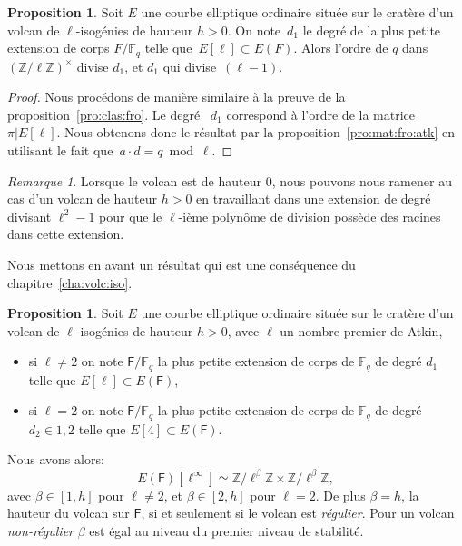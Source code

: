 \documentclass[10pt,a4paper]{book}
\theoremstyle{plain}
\theoremstyle{definition}
\theoremstyle{definition}
\theoremstyle{definition}
\theoremstyle{definition}
\newtheorem{prop}[thm]{Proposition}
\theoremstyle{definition}
\theoremstyle{remark}
\newtheorem{rem}[thm]{Remarque}
\theoremstyle{remark}
\theoremstyle{definition}
\begin{document}

\begin{prop}
Soit $E$ une courbe elliptique ordinaire située sur le cratère d'un 
volcan de $\ell$-isogénies de hauteur $h>0$. On note~$d_1$ le degré de la plus 
petite extension de corps $F/\mathbb{F}_q$ telle que~$E[\ell]\subset E(F)$. 
Alors l'ordre de $q$ dans $(\mathbb{Z}/ \ell \mathbb{Z})^\times$ divise $d_1$,
et $d_1$ qui divise~$(\ell-1)$.
\end{prop}

\begin{proof}
Nous procédons de manière similaire à la preuve de la proposition~\ref{pro:clas:fro}.
Le degré ~$d_1$ correspond à l'ordre de la matrice~$\pi|E[\ell]$.
Nous obtenons donc le résultat par la proposition~\ref{pro:mat:fro:atk} en 
utilisant le fait que~$a \cdot d = q \bmod \ell$. 
\end{proof}

\begin{rem}
\label{rem:hau:atk}
Lorsque le volcan est de hauteur $0$, nous pouvons nous ramener au cas d'un 
volcan de hauteur $h>0$ en travaillant dans une extension de degré divisant 
$\ell^2-1$ pour que le $\ell$-ième polynôme de division possède des racines 
dans cette extension.
\end{rem}

Nous mettons en avant un résultat qui est une conséquence du 
chapitre~\ref{cha:volc:iso}. 

\begin{prop}
\label{pro:atk:d1}
Soit $E$ une courbe elliptique ordinaire située sur le cratère d'un 
volcan de $\ell$-isogénies de hauteur $h>0$, avec $\ell$ un nombre premier 
de Atkin,
\begin{itemize}
\item si $\ell \neq 2$ on note $\mathsf{F}/\mathbb{F}_q$ la 
plus petite extension de corps de $\mathbb{F}_q$ de degré $d_1$ telle que 
$E[\ell] \subset E(\mathsf{F})$,
\item si $\ell=2$ on note $\mathsf{F}/\mathbb{F}_q$ la 
plus petite extension de corps de $\mathbb{F}_q$ de degré $d_2 \in {1,2}$ telle
que $E[4] \subset E(\mathsf{F})$.
\end{itemize}
Nous avons alors:
\[
E(\mathsf{F})[\ell^{\infty}] \simeq \mathbb{Z}/ \ell^{\beta} \mathbb{Z} \times \mathbb{Z}/ \ell^{\beta} \mathbb{Z}, 
\]
avec $\beta \in [1,h]$ pour $\ell \neq 2$, et $\beta \in [2,h]$ pour $\ell=2$. De 
plus $\beta=h$, la hauteur du volcan sur $\mathsf{F}$, si et seulement si le volcan est \emph{régulier}.
Pour un volcan \emph{non-régulier} $\beta$ est égal au niveau du premier niveau de stabilité. 
\end{prop}
\end{document}

